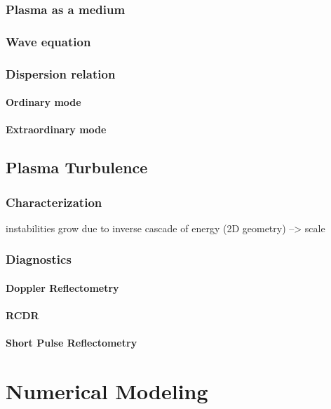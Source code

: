 \documentclass[11pt,a4paper]{report}
\begin{document}
\begin{multicols}{2}
    \subsection{Plasma as a medium}
    \subsection{Wave equation}
    \subsection{Dispersion relation}
    \subsubsection{Ordinary mode}
    \subsubsection{Extraordinary mode}

    \section{{Plasma Turbulence}}
    \subsection{Characterization}
    instabilities grow due to inverse cascade of energy (2D geometry) --> scale
    \subsection{Diagnostics}
    \subsubsection{Doppler Reflectometry}

    \subsubsection{RCDR}

    \subsubsection{Short Pulse Reflectometry}

    \chapter{Numerical Modeling}


\end{multicols}
\end{document}
